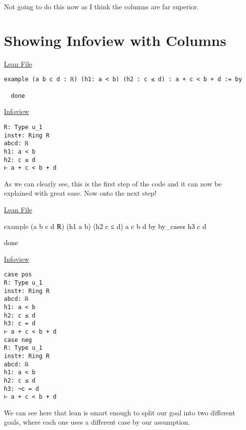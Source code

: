 \documentclass[
  letterpaper,
  DIV=11,
  numbers=noendperiod]{scrreprt}
\makeatletter
\newenvironment{Shaded}{\begin{snugshade}}{\end{snugshade}}
\newcommand{\ErrorTok}[1]{\textcolor[rgb]{0.68,0.00,0.00}{#1}}
\newcommand{\FunctionTok}[1]{\textcolor[rgb]{0.28,0.35,0.67}{#1}}
\newcommand{\NormalTok}[1]{\textcolor[rgb]{0.00,0.23,0.31}{#1}}
\newcommand{\OtherTok}[1]{\textcolor[rgb]{0.00,0.23,0.31}{#1}}
\newcommand{\SpecialCharTok}[1]{\textcolor[rgb]{0.37,0.37,0.37}{#1}}
\def\redsquiggly{\bgroup \markoverwith{\textcolor{red}{\lower3.5\p@\hbox{\sixly \char58}}}\ULon}
\def\bluesquiggly{\bgroup \markoverwith{\textcolor[HTML]{1E90FF}{\lower3.5\p@\hbox{\sixly \char58}}}\ULon}
\renewcommand{\NormalTok}[1]{\textcolor[HTML]{000000}{#1}}
\renewcommand{\SpecialCharTok}[1]{}
\renewcommand{\ErrorTok}[1]{\redsquiggly{#1}}
\renewcommand{\OtherTok}[1]{\bluesquiggly{#1}}
\theoremstyle{remark}
\makeatother
\begin{document}
Not going to do this now as I think the columns are far superior.

\hypertarget{showing-infoview-with-columns}{%
\section*{Showing Infoview with
Columns}\label{showing-infoview-with-columns}}


\ul{Lean File}

\begin{verbatim}
example (a b c d : ℝ) (h1: a < b) (h2 : c ≤ d) : a + c < b + d := by

  done
\end{verbatim}

\ul{Infoview}

\begin{verbatim}
R: Type u_1
inst✝: Ring R
abcd: ℝ
h1: a < b
h2: c ≤ d
⊢ a + c < b + d
\end{verbatim}

As we can clearly see, this is the first step of the code and it can now
be explained with great ease. Now onto the next step!

\ul{Lean File}

\begin{Shaded}
\begin{Highlighting}[]
\FunctionTok{example}\NormalTok{ (a b c d }\SpecialCharTok{:}\NormalTok{ ℝ) (h1}\SpecialCharTok{:}\NormalTok{ a }\SpecialCharTok{\textless{}}\NormalTok{ b) (h2 }\SpecialCharTok{:}\NormalTok{ c ≤ d) }\SpecialCharTok{:}\NormalTok{ a }\SpecialCharTok{+}\NormalTok{ c }\SpecialCharTok{\textless{}}\NormalTok{ b }\SpecialCharTok{+}\NormalTok{ d }\SpecialCharTok{:}\ErrorTok{=}\NormalTok{ by}
\NormalTok{  by\_cases h3 }\SpecialCharTok{:}\NormalTok{ c }\OtherTok{=}\NormalTok{ d}

\NormalTok{  done}
\end{Highlighting}
\end{Shaded}

\ul{Infoview}

\begin{verbatim}
case pos
R: Type u_1
inst✝: Ring R
abcd: ℝ
h1: a < b
h2: c ≤ d
h3: c = d
⊢ a + c < b + d
case neg
R: Type u_1
inst✝: Ring R
abcd: ℝ
h1: a < b
h2: c ≤ d
h3: ¬c = d
⊢ a + c < b + d
\end{verbatim}

We can see here that lean is smart enough to split our goal into two
different goals, where each one uses a different case by our assumption.
\end{document}
